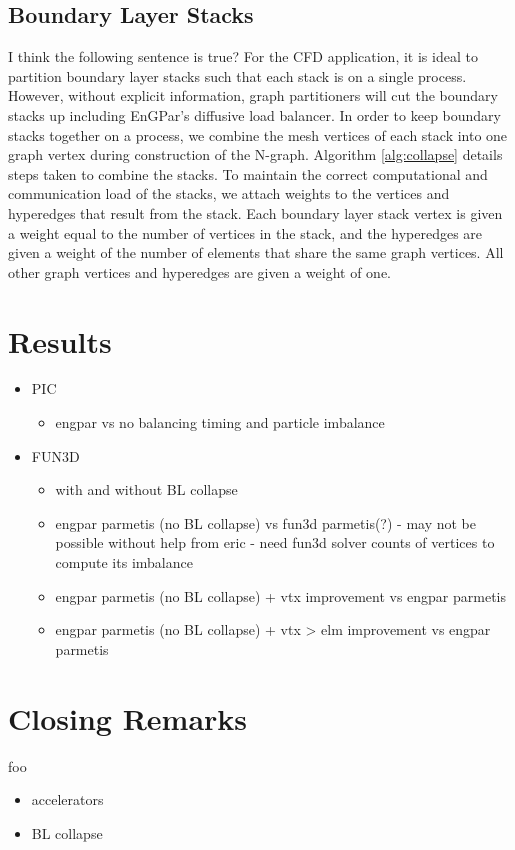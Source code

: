 \documentclass[conference]{IEEEtran}
\begin{document}
\subsection{Boundary Layer Stacks}

{\color{red} I think the following sentence is true?}
For the CFD application, it is ideal to partition boundary layer stacks such that each stack
is on a single process. However, without explicit information, graph partitioners will cut
the boundary stacks up including EnGPar's diffusive load balancer. In order to keep boundary
stacks together on a process, we combine the mesh vertices of each stack into one graph vertex
during construction of the N-graph. Algorithm \ref{alg:collapse} details steps taken to
combine the stacks. To maintain the correct computational and communication load of the stacks,
we attach weights to the vertices and hyperedges that result from the stack. Each boundary layer
stack vertex is given a weight equal to the number of vertices in the stack, and the hyperedges
are given a weight of the number of elements that share the same graph vertices. All other
graph vertices and hyperedges are given a weight of one.


\section{Results}
\begin{itemize}
\item PIC
\begin{itemize}
  \item engpar vs no balancing timing and particle imbalance
\end{itemize}
\item FUN3D
\begin{itemize}
  \item with and without BL collapse
  \item engpar parmetis (no BL collapse) vs fun3d parmetis(?) - may not be
    possible without help from eric - need fun3d solver counts of vertices to
    compute its imbalance
  \item engpar parmetis (no BL collapse) + vtx improvement vs engpar parmetis
  \item engpar parmetis (no BL collapse) + vtx > elm improvement vs engpar parmetis
\end{itemize}
\end{itemize}


\section{Closing Remarks}
foo

\begin{itemize}
\item accelerators
\item BL collapse
\end{itemize}



\end{document}
